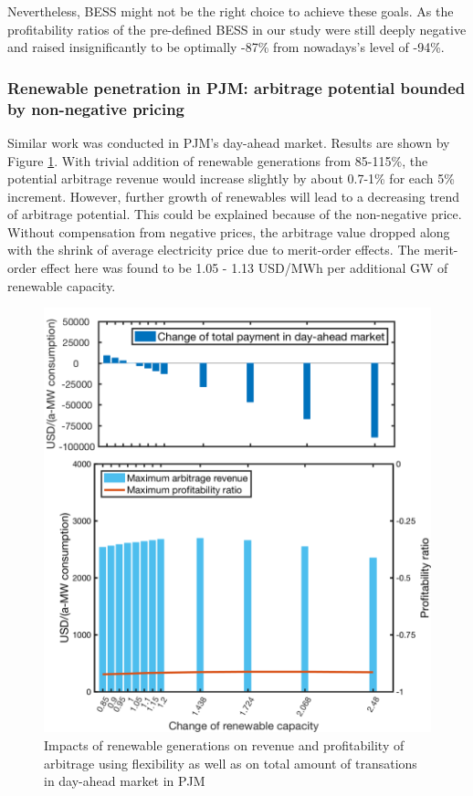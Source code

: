 Nevertheless, BESS might not be the right choice to achieve these goals. As the profitability ratios of the pre-defined BESS in our study were still deeply negative and raised insignificantly to be optimally -87\% from nowadays's level of -94\%.

\subsubsection{Renewable penetration in PJM: arbitrage potential bounded by non-negative pricing}

Similar work was conducted in PJM's day-ahead market. Results are shown by Figure \ref{fig:renew_pjm}. With trivial addition of renewable generations from 85-115\%, the potential arbitrage revenue would increase slightly by about 0.7-1\% for each 5\% increment. However, further growth of renewables will lead to a decreasing trend of arbitrage potential. This could be explained because of the non-negative price. Without compensation from negative prices, the arbitrage value dropped along with the shrink of average electricity price due to merit-order effects. The merit-order effect here was found to be 1.05 - 1.13 USD/MWh per additional GW of renewable capacity.

\begin{figure}[h!]
	\centering
	\includegraphics[width=0.95\linewidth]{Figures/RenewablePenetration_PJM}
	\caption{Impacts of renewable generations on revenue and profitability of arbitrage using flexibility as well as on total amount of transations in day-ahead market in PJM}
	\label{fig:renew_pjm}
\end{figure}

